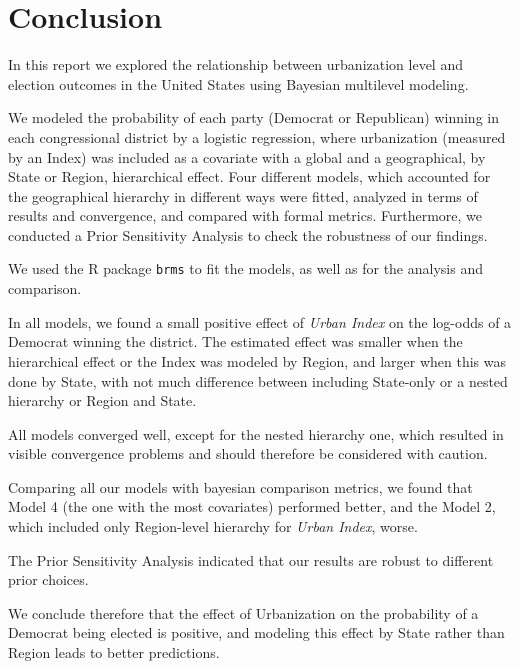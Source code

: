 \documentclass[12pt]{article}
\begin{document}
\section{Conclusion}


In this report we explored the relationship between urbanization level and election outcomes in the United States using Bayesian multilevel modeling. 

We modeled the probability of each party (Democrat or Republican) winning in each congressional district by a logistic regression, where urbanization (measured by an Index) was included as a covariate with a global and a geographical, by State or Region, hierarchical effect. Four different models, which accounted for the geographical hierarchy in different ways were fitted, analyzed in terms of results and convergence, and compared with formal metrics. Furthermore, we conducted a Prior Sensitivity Analysis to check the robustness of our findings.

We used the R package \verb*|brms| to fit the models, as well as for the analysis and comparison.

In all models, we found a small positive effect of \textit{Urban Index} on the log-odds of a Democrat winning the district. The estimated effect was smaller when the hierarchical effect or the Index was modeled by Region, and larger when this was done by State, with not much difference between including State-only or a nested hierarchy or Region and State.

All models converged well, except for the nested hierarchy one, which resulted in visible convergence problems and should therefore be considered with caution.

Comparing all our models with bayesian comparison metrics, we found that Model 4 (the one with the most covariates) performed better, and the Model 2, which included only Region-level hierarchy for \textit{Urban Index}, worse. 

The Prior Sensitivity Analysis indicated that our results are robust to different prior choices.

We conclude therefore that the effect of Urbanization on the probability of a Democrat being elected is positive, and modeling this effect by State rather than Region leads to better predictions.









\newpage
\appendix
\setcounter{table}{0}
\renewcommand{\thetable}{A\arabic{table}}
\setcounter{figure}{0}
\renewcommand{\thefigure}{A\arabic{figure}}
\end{document}
